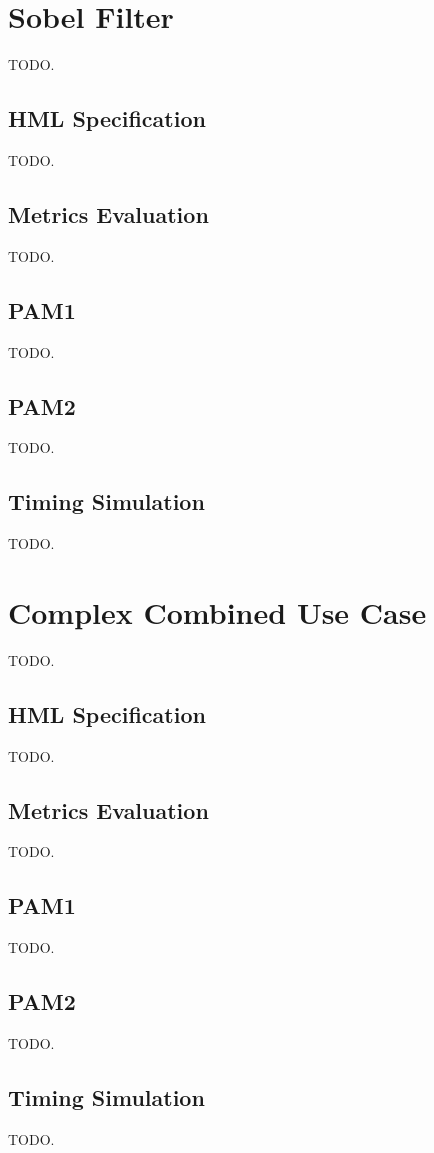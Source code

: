 \section{Sobel Filter}
%
TODO.
%
\subsection{HML Specification}
%
TODO.
%
\subsection{Metrics Evaluation}
%
TODO.
%
\subsection{PAM1}
%
TODO.
%
\subsection{PAM2}
%
TODO.
%
\subsection{Timing Simulation}
%
TODO.
%
\section{Complex Combined Use Case}
%
TODO.
%
\subsection{HML Specification}
%
TODO.
%
\subsection{Metrics Evaluation}
%
TODO.
%
\subsection{PAM1}
%
TODO.
%
\subsection{PAM2}
%
TODO.
%
\subsection{Timing Simulation}
%
TODO.
%




